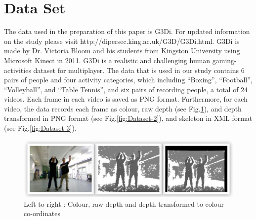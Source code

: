 \documentclass[runningheads,a4paper]{llncs}
\begin{document}
\section{Data Set}

	The data used in the preparation of this paper is G3Di. For updated information on the study please visit  http://dipersec.king.ac.uk/G3D/G3Di.html.\cite{1} G3Di is made by Dr. Victoria Bloom and his students from Kingston University using Microsoft Kinect in 2011. G3Di is a realistic and challenging human gaming-activities dataset for multiplayer.\cite{1} The data that is used in our study contains 6 pairs of people and four activity categories, which including “Boxing”, “Football”, “Volleyball”, and “Table Tennis”, and six pairs of recording people, a total of 24 videos. Each frame in each video is saved as PNG format. Furthermore, for each video, the data records each frame as colour, raw depth (see Fig.\ref{fig:Dataset-1}), and depth transformed in PNG format (see Fig.\ref{fig:Dataset-2}), and skeleton in XML format (see Fig.\ref{fig:Dataset-3}).

	\begin{figure}[htbp]
	\centering
	\includegraphics[scale=0.55]{dataset-1.JPG}
	\caption{Left to right : Colour, raw depth and depth transformed to colour co-ordinates}
	\label{fig:Dataset-1}
	\end{figure}
\end{document}
